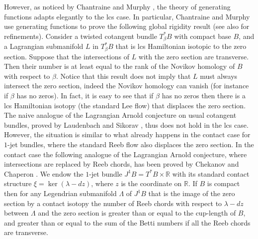 \documentclass{amsart}
\theoremstyle{remark}
\begin{document}
However,
as noticed by Chantraine and Murphy \cite{CM},
the theory of generating functions
adapts elegantly to the lcs case.
In particular,
Chantraine and Murphy use generating functions
to prove the following global rigidity result
(see also \cite{Currier 2} for refinements).
Consider a twisted cotangent bundle $T_{\beta}^{\ast}B$
with compact base $B$,
and a Lagrangian submanifold $L$ in $T_{\beta}^{\ast}B$
that is lcs Hamiltonian isotopic to the zero section.
Suppose that the intersections of $L$ with the zero section are transverse.
Then their number is at least equal
to the rank of the Novikov homology of $B$
with respect to $\beta$.
Notice that this result does not imply
that $L$ must always intersect the zero section,
indeed the Novikov homology can vanish
(for instance if $\beta$ has no zeros).
In fact, it is easy to see that if $\beta$ has no zeros
then there is a lcs Hamiltonian isotopy
(the standard Lee flow)
that displaces the zero section.
The naive analogue of the Lagrangian Arnold conjecture
on usual cotangent bundles,
proved by Laudenbach and Sikorav \cite{LS},
thus does not hold in the lcs case. 
However,
the situation is similar
to what already happens in the contact case
for $1$-jet bundles,
where the standard Reeb flow also displaces the zero section.
In the contact case
the following analogue
of the Lagrangian Arnold conjecture,
where intersections are replaced by Reeb chords,
has been proved by Chekanov \cite{Chekanov}
and Chaperon \cite{Chaperon}.
We endow the $1$-jet bundle $J^1B = T^{\ast}B \times \mathbb{R}$
with its standard contact structure $\xi = \ker (\lambda - dz)$,
where $z$ is the coordinate on $\mathbb{R}$.
If $B$ is compact %
then for any Legendrian submanifold $\Lambda$ of $J^1B$
that is the image of the zero section by a contact isotopy
the number of Reeb chords with respect to $\lambda - dz$
between $\Lambda$ and the zero section
is greater than or equal to the cup-length of $B$,
and greater than or equal to the sum of the Betti numbers
if all the Reeb chords are transverse.
\end{document}
